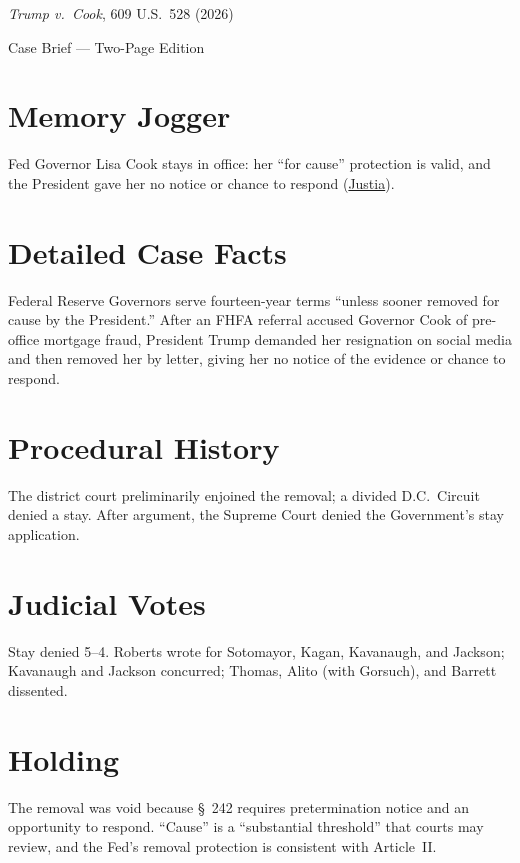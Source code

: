 \documentclass[12pt]{article}
\begin{document}
\begin{center}
{\LARGE \textit{Trump v.\ Cook}, 609 U.S.\ 528 (2026)\par}
\vspace{0.5em}
{\large Case Brief --- Two-Page Edition\par}
\end{center}

\section{Memory Jogger}
Fed Governor Lisa Cook stays in office: her ``for cause'' protection is valid, and the President gave her no notice or chance to respond (\href{https://supreme.justia.com/cases/federal/us/609/25a312/}{Justia}).

\section{Detailed Case Facts}
Federal Reserve Governors serve fourteen-year terms ``unless sooner removed for cause by the President.'' After an FHFA referral accused Governor Cook of pre-office mortgage fraud, President Trump demanded her resignation on social media and then removed her by letter, giving her no notice of the evidence or chance to respond.

\section{Procedural History}
The district court preliminarily enjoined the removal; a divided D.C.\ Circuit denied a stay. After argument, the Supreme Court denied the Government's stay application.

\section{Judicial Votes}
Stay denied 5--4. Roberts wrote for Sotomayor, Kagan, Kavanaugh, and Jackson; Kavanaugh and Jackson concurred; Thomas, Alito (with Gorsuch), and Barrett dissented.

\section{Holding}
The removal was void because \S~242 requires pretermination notice and an opportunity to respond. ``Cause'' is a ``substantial threshold'' that courts may review, and the Fed's removal protection is consistent with Article~II.
\end{document}

